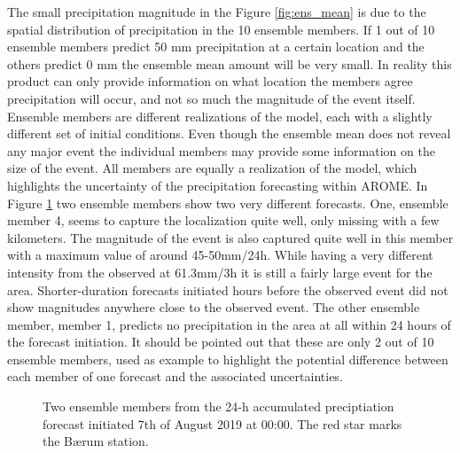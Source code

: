 The small precipitation magnitude in the Figure \ref{fig:ens_mean} is due to the spatial distribution of precipitation in the 10 ensemble members. If 1 out of 10 ensemble members predict 50 mm precipitation at a certain location and the others predict 0 mm the ensemble mean amount will be very small. In reality this product can only provide information on what location the members agree precipitation will occur, and not so much the magnitude of the event itself. Ensemble members are different realizations of the model, each with a slightly different set of initial conditions. Even though the ensemble mean does not reveal any major event the individual members may provide some information on the size of the event. All members are equally a realization of the model, which highlights the uncertainty of the precipitation forecasting within AROME. In Figure \ref{fig:ensmember} two ensemble members show two very different forecasts. One, ensemble member 4, seems to capture the localization quite well, only missing with a few kilometers. The magnitude of the event is also captured quite well in this member with a maximum value of around 45-50mm/24h. While having a very different intensity from the observed at 61.3mm/3h it is still a fairly large event for the area. Shorter-duration forecasts initiated hours before the observed event did not show magnitudes anywhere close to the observed event. The other ensemble member, member 1, predicts no precipitation in the area at all within 24 hours of the forecast initiation. It should be pointed out that these are only 2 out of 10 ensemble members, used as example to highlight the potential difference between each member of one forecast and the associated uncertainties.   

\begin{figure}[hbt!]%
    \centering
    \qquad
    \caption{Two ensemble members from the 24-h accumulated preciptiation forecast initiated 7th of August 2019 at 00:00. The red star marks the Bærum station.}%
    \label{fig:ensmember}%
\end{figure}

